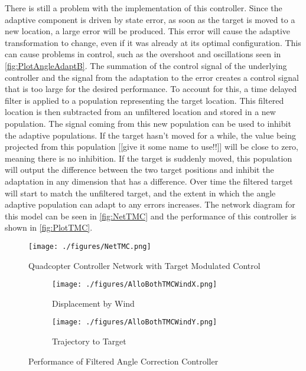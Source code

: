\documentclass[letterpaper,12pt,titlepage,oneside,final]{book}
\begin{document}
There is still a problem with the implementation of this controller. 
Since the adaptive component is driven by state error, as soon as the target is moved to a new location, a large error will be produced. 
This error will cause the adaptive transformation to change, even if it was already at its optimal configuration. 
This can cause problems in control, such as the overshoot and oscillations seen in \autoref{fig:PlotAngleAdaptB}. 
The summation of the control signal of the underlying controller and the signal from the adaptation to the error creates a control signal that is too large for the desired performance. 
To account for this, a time delayed filter is applied to a population representing the target location. 
This filtered location is then subtracted from an unfiltered location and stored in a new population. The signal coming from this new population can be used to inhibit the adaptive populations. 
If the target hasn't moved for a while, the value being projected from this population [[give it some name to use!!]] will be close to zero, meaning there is no inhibition. 
If the target is suddenly moved, this population will output the difference between the two target positions and inhibit the adaptation in any dimension that has a difference. 
Over time the filtered target will start to match the unfiltered target, and the extent in which the angle adaptive population can adapt to any errors increases. 
The network diagram for this model can be seen in \autoref{fig:NetTMC} and the performance of this controller is shown in \autoref{fig:PlotTMC}.


\begin{figure}
\centering
\texttt{[image: ./figures/NetTMC.png]} %
\caption{Quadcopter Controller Network with Target Modulated Control}
\label{fig:NetTMC}
\end{figure}

\begin{figure}
\centering
\begin{subfigure}[t]{0.4\textwidth}
\texttt{[image: ./figures/AlloBothTMCWindX.png]} %
\caption{Displacement by Wind}
\end{subfigure}
\begin{subfigure}[t]{0.4\textwidth}
\texttt{[image: ./figures/AlloBothTMCWindY.png]}
\caption{Trajectory to Target}
\end{subfigure}
\caption{Performance of Filtered Angle Correction Controller}
\label{fig:PlotTMC}
\end{figure}
\end{document}
